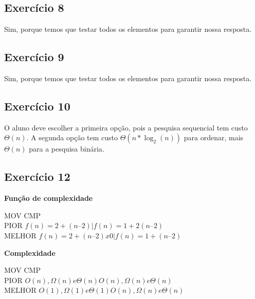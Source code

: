 \documentclass[12pt]{article}
\begin{document}
        \subsection{Exercício 8}
            Sim, porque temos que testar todos os elementos para garantir nossa resposta.
        \subsection{Exercício 9}
            Sim, porque temos que testar todos os elementos para garantir nossa resposta.
        \subsection{Exercício 10}
            O aluno deve escolher a primeira opção, pois a pesquisa sequencial tem custo $\Theta(n)$.
            A segunda opção tem custo $\Theta(n*\log_2(n))$ para ordenar, mais $\Theta(n)$ para a pesquisa binária.
        \subsection{Exercício 12}
            \textbf{Função de complexidade}

            MOV     CMP\\

            PIOR $f(n) = 2 + (n – 2) | f(n) = 1 + 2(n – 2)$
            \\MELHOR $f(n) = 2 + (n – 2) x 0 | f(n) = 1 + (n – 2)$

            \textbf{Complexidade}

            MOV CMP\\
            PIOR $O(n), \Omega(n) e \Theta(n) O(n), \Omega(n) e \Theta(n)$
            \\MELHOR $O(1), \Omega(1) e \Theta(1) O(n), \Omega(n) e \Theta(n)$
\end{document}

